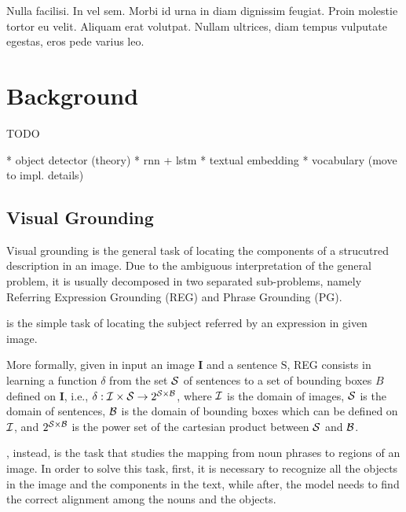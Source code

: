 
\begin{savequote}[75mm]
Nulla facilisi. In vel sem. Morbi id urna in diam dignissim feugiat. Proin molestie tortor eu velit. Aliquam erat volutpat. Nullam ultrices, diam tempus vulputate egestas, eros pede varius leo.
\end{savequote}

\chapter{Background}

TODO

* object detector (theory)
* rnn + lstm
* textual embedding
* vocabulary (move to impl. details)

\section{Visual Grounding}

Visual grounding is the general task of locating the components of a
strucutred description in an image. Due to the ambiguous
interpretation of the general problem, it is usually decomposed in two
separated sub-problems, namely Referring Expression Grounding (REG)
and Phrase Grounding (PG).

 is the simple task of
locating the subject referred by an expression in given image.

More formally, given in input an image $\bm{I}$ and a sentence
$\mathrm{S}$, REG consists in learning a function $\delta$ from the
set $\mathcal{S}$ of sentences to a set of bounding boxes $B$ defined on
$\bm{I}$, i.e., $\delta: \mathcal{I} \times \mathcal{S} \rightarrow 2^{\mathcal{S}
\times \mathcal{B}}$, where $\mathcal{I}$ is the domain of images, $\mathcal{S}$ is the
domain of sentences, $\mathcal{B}$ is the domain of bounding boxes which can
be defined on $\mathcal{I}$, and $2^{\mathcal{S} \times \mathcal{B}}$ is the power set
of the cartesian product between $\mathcal{S}$ and $\mathcal{B}$.

, instead, is the task that studies the
mapping from noun phrases to regions of an image. In order to solve
this task, first, it is necessary to recognize all the objects in the
image and the components in the text, while after, the model needs to
find the correct alignment among the nouns and the objects.

